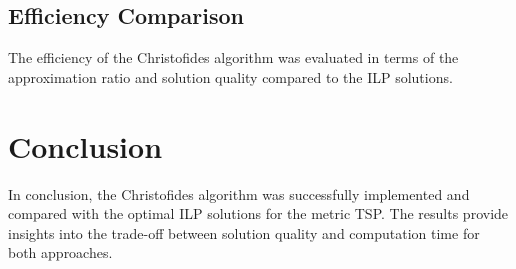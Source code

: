 \subsection*{Efficiency Comparison}

The efficiency of the Christofides algorithm was evaluated in terms of the approximation ratio and solution quality compared to the ILP solutions.

\section*{Conclusion}

In conclusion, the Christofides algorithm was successfully implemented and compared with the optimal ILP solutions for the metric TSP. The results provide insights into the trade-off between solution quality and computation time for both approaches.

